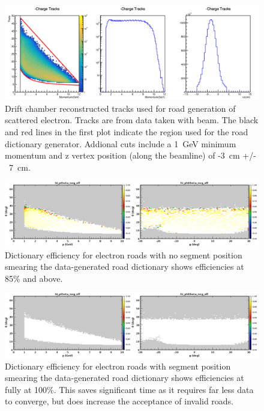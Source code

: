 \begin{figure}[hbt]
	\centering
	\includegraphics[width=1.0\columnwidth,keepaspectratio]{img/dc_roads_electrons_data.png}
	\caption{Drift chamber reconstructed tracks used for road generation of scattered electron. Tracks are from data taken with beam. The black and red lines in the first plot indicate the region used for the road dictionary generator. Addional cuts include a 1~GeV minimum momentum and z vertex position (along the beamline) of -3~cm +/-~7~cm.}
	\label{fig:dc_roads_electrons_data}
\end{figure}

\begin{figure}[hbt]
	\centering
	\includegraphics[width=1.0\columnwidth,keepaspectratio]{img/dc_neg_data_efficiency_nosmearing.png}
	\caption{Dictionary efficiency for electron roads with no segment position smearing the data-generated road dictionary shows efficiencies at 85\% and above.}
	\label{fig:dc_neg_data_efficiency_nosmearing}
\end{figure}

\begin{figure}[hbt]
	\centering
	\includegraphics[width=1.0\columnwidth,keepaspectratio]{img/dc_neg_data_efficiency_smearing.png}
	\caption{Dictionary efficiency for electron roads with segment position smearing the data-generated road dictionary shows efficiencies at fully at 100\%. This saves significant time as it requires far less data to converge, but does increase the acceptance of invalid roads.}
	\label{fig:dc_neg_data_efficiency_smearing}
\end{figure}


